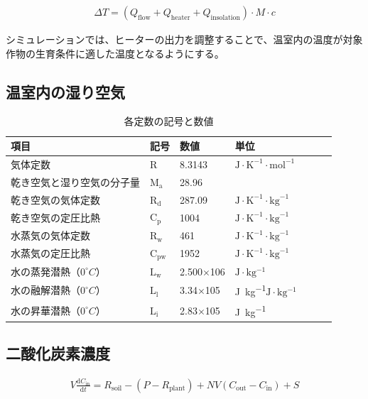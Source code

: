 \documentclass[uplatex,dvipdfmx,nomag,a4paper,oneside,onecolumn,12pt]{bxjsreport} %
\begin{document}
\begin{align}
    \Delta T = (Q_\text{flow} + Q_\text{heater} + Q_\text{insolation}) \cdot M \cdot c
    \label{DeltaT}
\end{align}

シミュレーションでは、ヒーターの出力を調整することで、温室内の温度が対象作物の生育条件に適した温度となるようにする。

\subsection{温室内の湿り空気}
\begin{table}[ht]
    \caption{各定数の記号と数値}
    \label{tab:constant}
    \centering
    \begin{tabular}{llllrrc}
        \toprule %
        項目 & 記号 & 数値 & 単位\\
        \midrule %
        気体定数 & \(\mathrm{R}\) & 8.3143 & \(\mathrm{J}\cdot\mathrm{K}^{-1}\cdot\mathrm{mol}^{-1}\) \\
        乾き空気と湿り空気の分子量 & \(\mathrm{M_a}\) & 28.96 & \\
        乾き空気の気体定数 & \(\mathrm{R_d}\) & 287.09 & \(\mathrm{J}\cdot\mathrm{K}^{-1}\cdot\mathrm{kg}^{-1}\)\\
        乾き空気の定圧比熱 & \(\mathrm{C_p}\) & 1004 & \(\mathrm{J}\cdot\mathrm{K}^{-1}\cdot\mathrm{kg}^{-1}\)\\
        水蒸気の気体定数 & \(\mathrm{R_w}\) & 461 & \(\mathrm{J}\cdot\mathrm{K}^{-1}\cdot\mathrm{kg}^{-1}\)\\
        水蒸気の定圧比熱 & \(\mathrm{C_{pw}}\) & 1952 & \(\mathrm{J}\cdot\mathrm{K}^{-1}\cdot\mathrm{kg}^{-1}\)\\
        水の蒸発潜熱（\(0^\circ C\)） & \(\mathrm{L_w}\) & 2.500\(\times\)106 & \(\mathrm{J}\cdot\mathrm{kg^{-1}}\)\\
        水の融解潜熱（\(0^\circ C\)） & \(\mathrm{L_l}\) & 3.34\(\times\)105 &  \si{J.kg^{-1}}\(\mathrm{J}\cdot\mathrm{kg^{-1}}\)\\
        水の昇華潜熱（\(0^\circ C\)） & \(\mathrm{L_i}\) & 2.83\(\times\)105 & \si{J.kg^{-1}}\\
        \bottomrule %
    \end{tabular}
\end{table}

\subsection{二酸化炭素濃度}
\begin{align}
    V\frac{\mathrm{d}C_{\mathrm{in}}}{\mathrm{d}t} = R_\mathrm{soil} - (P - R_\mathrm{plant}) + N V (C_\mathrm{out} - C_\mathrm{in}) + S
    \label{eq:co2flow}
\end{align}
\end{document}
